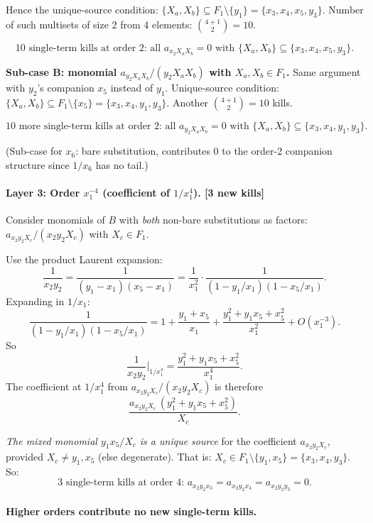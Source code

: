 \documentclass[11pt]{article}
\theoremstyle{definition}
\begin{document}
Hence the unique-source condition: $\{X_a,X_b\}\subseteq F_1\setminus\{y_1\}=\{x_3,x_4,x_5,y_3\}$.
Number of such multisets of size 2 from 4 elements: $\binom{4+1}{2}=10$.

\[
\boxed{\text{10 single-term kills at order 2: all }a_{x_2 X_a X_b}=0\text{ with }\{X_a,X_b\}\subseteq\{x_3,x_4,x_5,y_3\}.}
\]

\textbf{Sub-case B: monomial $a_{y_2 X_a X_b}/(y_2 X_a X_b)$ with $X_a,X_b\in F_1$.}
Same argument with $y_2$'s companion $x_5$ instead of $y_1$. Unique-source
condition: $\{X_a,X_b\}\subseteq F_1\setminus\{x_5\}=\{x_3,x_4,y_1,y_3\}$.
Another $\binom{4+1}{2}=10$ kills.

\[
\boxed{\text{10 more single-term kills at order 2: all }a_{y_2 X_a X_b}=0\text{ with }\{X_a,X_b\}\subseteq\{x_3,x_4,y_1,y_3\}.}
\]

(Sub-case for $x_6$: bare substitution, contributes $0$ to the order-2
companion structure since $1/x_6$ has no tail.)

\paragraph{Layer 3: Order $x_1^{-4}$ (coefficient of $1/x_1^4$). [\textbf{3 new kills}]}

Consider monomials of $B$ with \emph{both} non-bare substitutions as
factors: $a_{x_2 y_2 X_c}/(x_2 y_2 X_c)$ with $X_c\in F_1$.

Use the product Laurent expansion:
\[
\frac{1}{x_2 y_2}=\frac{1}{(y_1-x_1)(x_5-x_1)}=\frac{1}{x_1^2}\cdot\frac{1}{(1-y_1/x_1)(1-x_5/x_1)}.
\]
Expanding in $1/x_1$:
\[
\frac{1}{(1-y_1/x_1)(1-x_5/x_1)}
= 1 + \frac{y_1+x_5}{x_1} + \frac{y_1^2+y_1 x_5+x_5^2}{x_1^2} + O(x_1^{-3}).
\]
So
\[
\frac{1}{x_2 y_2}\bigg|_{1/x_1^4} = \frac{y_1^2+y_1 x_5+x_5^2}{x_1^4}.
\]
The coefficient at $1/x_1^4$ from $a_{x_2 y_2 X_c}/(x_2 y_2 X_c)$ is therefore
\[
\frac{a_{x_2 y_2 X_c}\,(y_1^2+y_1 x_5+x_5^2)}{X_c}.
\]

\emph{The mixed monomial $y_1 x_5/X_c$ is a unique source} for the
coefficient $a_{x_2 y_2 X_c}$, provided $X_c\ne y_1, x_5$ (else degenerate).
That is: $X_c\in F_1\setminus\{y_1,x_5\}=\{x_3,x_4,y_3\}$. So:
\[
\boxed{\text{3 single-term kills at order 4: }
a_{x_2 y_2 x_3}=a_{x_2 y_2 x_4}=a_{x_2 y_2 y_3}=0.}
\]

\paragraph{Higher orders contribute no new single-term kills.}
\end{document}
